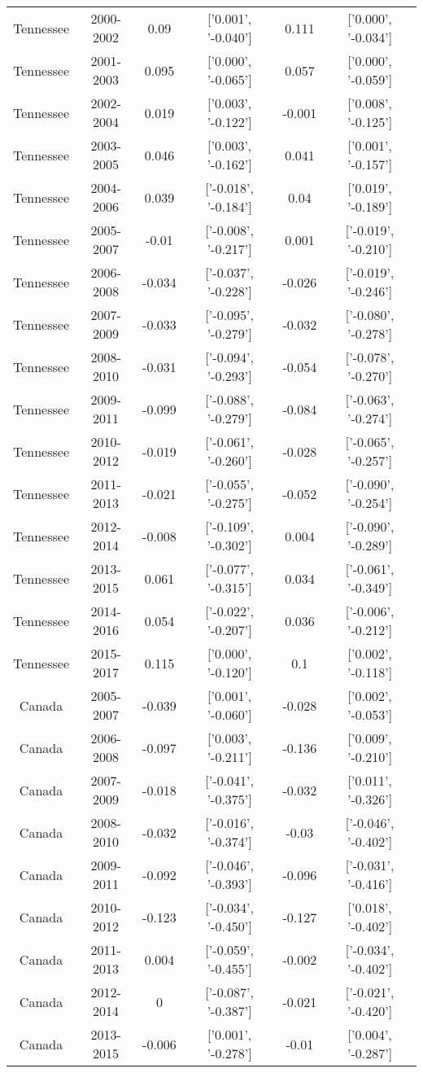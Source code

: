 \documentclass[utf8]{FrontiersinHarvard} %
\begin{document}
\begin{table}[h]
\begin{tabular}{|c|c|c|c|c|c|}
	Tennessee & 2000-2002 & 0.09 & ['0.001', '-0.040'] & 0.111 & ['0.000', '-0.034']\\
	Tennessee & 2001-2003 & 0.095 & ['0.000', '-0.065'] & 0.057 & ['0.000', '-0.059']\\
	Tennessee & 2002-2004 & 0.019 & ['0.003', '-0.122'] & -0.001 & ['0.008', '-0.125']\\
	Tennessee & 2003-2005 & 0.046 & ['0.003', '-0.162'] & 0.041 & ['0.001', '-0.157']\\
	Tennessee & 2004-2006 & 0.039 & ['-0.018', '-0.184'] & 0.04 & ['0.019', '-0.189']\\
	Tennessee & 2005-2007 & -0.01 & ['-0.008', '-0.217'] & 0.001 & ['-0.019', '-0.210']\\
	Tennessee & 2006-2008 & -0.034 & ['-0.037', '-0.228'] & -0.026 & ['-0.019', '-0.246']\\
	Tennessee & 2007-2009 & -0.033 & ['-0.095', '-0.279'] & -0.032 & ['-0.080', '-0.278']\\
	Tennessee & 2008-2010 & -0.031 & ['-0.094', '-0.293'] & -0.054 & ['-0.078', '-0.270']\\
	Tennessee & 2009-2011 & -0.099 & ['-0.088', '-0.279'] & -0.084 & ['-0.063', '-0.274']\\
	Tennessee & 2010-2012 & -0.019 & ['-0.061', '-0.260'] & -0.028 & ['-0.065', '-0.257']\\
	Tennessee & 2011-2013 & -0.021 & ['-0.055', '-0.275'] & -0.052 & ['-0.090', '-0.254']\\
	Tennessee & 2012-2014 & -0.008 & ['-0.109', '-0.302'] & 0.004 & ['-0.090', '-0.289']\\
	Tennessee & 2013-2015 & 0.061 & ['-0.077', '-0.315'] & 0.034 & ['-0.061', '-0.349']\\
	Tennessee & 2014-2016 & 0.054 & ['-0.022', '-0.207'] & 0.036 & ['-0.006', '-0.212']\\
	Tennessee & 2015-2017 & 0.115 & ['0.000', '-0.120'] & 0.1 & ['0.002', '-0.118']\\
	\midrule
	Canada & 2005-2007 & -0.039 & ['0.001', '-0.060'] & -0.028 & ['0.002', '-0.053']\\
	Canada & 2006-2008 & -0.097 & ['0.003', '-0.211'] & -0.136 & ['0.009', '-0.210']\\
	Canada & 2007-2009 & -0.018 & ['-0.041', '-0.375'] & -0.032 & ['0.011', '-0.326']\\
	Canada & 2008-2010 & -0.032 & ['-0.016', '-0.374'] & -0.03 & ['-0.046', '-0.402']\\
	Canada & 2009-2011 & -0.092 & ['-0.046', '-0.393'] & -0.096 & ['-0.031', '-0.416']\\
	Canada & 2010-2012 & -0.123 & ['-0.034', '-0.450'] & -0.127 & ['0.018', '-0.402']\\
	Canada & 2011-2013 & 0.004 & ['-0.059', '-0.455'] & -0.002 & ['-0.034', '-0.402']\\
	Canada & 2012-2014 & 0 & ['-0.087', '-0.387'] & -0.021 & ['-0.021', '-0.420']\\
	Canada & 2013-2015 & -0.006 & ['0.001', '-0.278'] & -0.01 & ['0.004', '-0.287']\\
	\bottomrule
\end{tabular}
\end{table}
\end{document}
